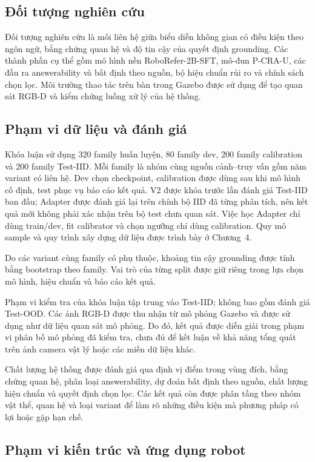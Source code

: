 \subsection{Đối tượng nghiên cứu}

Đối tượng nghiên cứu là mối liên hệ giữa biểu diễn không gian có điều kiện theo ngôn ngữ, bằng chứng quan hệ và độ tin cậy của quyết định grounding. Các thành phần cụ thể gồm mô hình nền RoboRefer-2B-SFT, mô-đun P-CRA-U, các đầu ra answerability và bất định theo nguồn, bộ hiệu chuẩn rủi ro và chính sách chọn lọc. Môi trường thao tác trên bàn trong Gazebo được sử dụng để tạo quan sát RGB-D và kiểm chứng luồng xử lý của hệ thống.

\subsection{Phạm vi dữ liệu và đánh giá}

Khóa luận sử dụng 320 family huấn luyện, 80 family dev, 200 family calibration và 200 family Test-IID. Mỗi family là nhóm cùng nguồn cảnh--truy vấn gồm năm variant có liên hệ. Dev chọn checkpoint, calibration được dùng sau khi mô hình cố định, test phục vụ báo cáo kết quả. V2 được khóa trước lần đánh giá Test-IID ban đầu; Adapter được đánh giá lại trên chính bộ IID đã từng phân tích, nên kết quả mới không phải xác nhận trên bộ test chưa quan sát. Việc học Adapter chỉ dùng train/dev, fit calibrator và chọn ngưỡng chỉ dùng calibration. Quy mô sample và quy trình xây dựng dữ liệu được trình bày ở Chương~4.

Do các variant cùng family có phụ thuộc, khoảng tin cậy grounding được tính bằng bootstrap theo family. Vai trò của từng split được giữ riêng trong lựa chọn mô hình, hiệu chuẩn và báo cáo kết quả.

Phạm vi kiểm tra của khóa luận tập trung vào Test-IID; không bao gồm đánh giá Test-OOD. Các ảnh RGB-D được thu nhận từ mô phỏng Gazebo và được sử dụng như dữ liệu quan sát mô phỏng. Do đó, kết quả được diễn giải trong phạm vi phân bố mô phỏng đã kiểm tra, chưa đủ để kết luận về khả năng tổng quát trên ảnh camera vật lý hoặc các miền dữ liệu khác.

Chất lượng hệ thống được đánh giá qua định vị điểm trong vùng đích, bằng chứng quan hệ, phân loại answerability, dự đoán bất định theo nguồn, chất lượng hiệu chuẩn và quyết định chọn lọc. Các kết quả còn được phân tầng theo nhóm vật thể, quan hệ và loại variant để làm rõ những điều kiện mà phương pháp có lợi hoặc gặp hạn chế.

\subsection{Phạm vi kiến trúc và ứng dụng robot}

